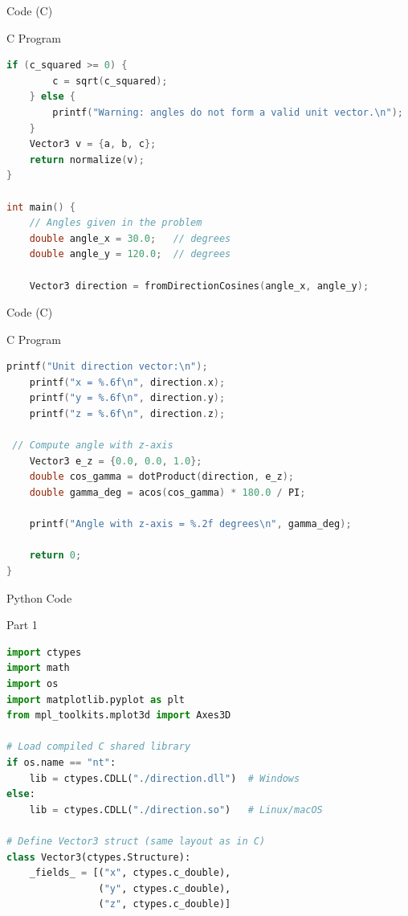\documentclass{beamer}
\begin{document}
\begin{frame}[fragile]{ Code (C)}
\begin{block}{C Program}
\begin{lstlisting}[language=C, basicstyle=\ttfamily\small, keywordstyle=\color{blue}, frame=single]
if (c_squared >= 0) {
        c = sqrt(c_squared);
    } else {
        printf("Warning: angles do not form a valid unit vector.\n");
    }
    Vector3 v = {a, b, c};
    return normalize(v);
}

int main() {
    // Angles given in the problem
    double angle_x = 30.0;   // degrees
    double angle_y = 120.0;  // degrees

    Vector3 direction = fromDirectionCosines(angle_x, angle_y);
\end{lstlisting}
\end{block}
\end{frame}

\begin{frame}[fragile]{ Code (C)}
\begin{block}{C Program}
\begin{lstlisting}[language=C, basicstyle=\ttfamily\small, keywordstyle=\color{blue}, frame=single]
 printf("Unit direction vector:\n");
    printf("x = %.6f\n", direction.x);
    printf("y = %.6f\n", direction.y);
    printf("z = %.6f\n", direction.z);

 // Compute angle with z-axis
    Vector3 e_z = {0.0, 0.0, 1.0};
    double cos_gamma = dotProduct(direction, e_z);
    double gamma_deg = acos(cos_gamma) * 180.0 / PI;

    printf("Angle with z-axis = %.2f degrees\n", gamma_deg);

    return 0;
}
\end{lstlisting}
\end{block}
\end{frame}

\begin{frame}[fragile]{Python Code}
\begin{block}{Part 1}
\begin{lstlisting}[language=Python, basicstyle=\ttfamily\small, keywordstyle=\color{blue}, frame=single]
import ctypes
import math
import os
import matplotlib.pyplot as plt
from mpl_toolkits.mplot3d import Axes3D

# Load compiled C shared library
if os.name == "nt":
    lib = ctypes.CDLL("./direction.dll")  # Windows
else:
    lib = ctypes.CDLL("./direction.so")   # Linux/macOS

# Define Vector3 struct (same layout as in C)
class Vector3(ctypes.Structure):
    _fields_ = [("x", ctypes.c_double),
                ("y", ctypes.c_double),
                ("z", ctypes.c_double)]
\end{lstlisting}
\end{block}
\end{frame}
\end{document}
